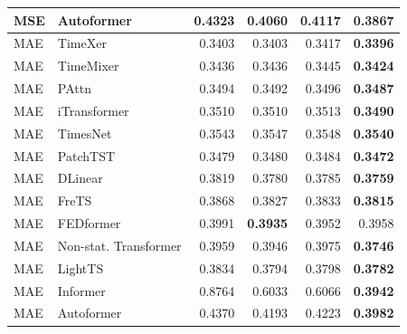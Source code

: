 \begin{longtable}{llrrrr}
MSE & Autoformer & 0.4323 & 0.4060 & 0.4117 & \textbf{0.3867} \\
\midrule
MAE & TimeXer & 0.3403 & 0.3403 & 0.3417 & \textbf{0.3396} \\
MAE & TimeMixer & 0.3436 & 0.3436 & 0.3445 & \textbf{0.3424} \\
MAE & PAttn & 0.3494 & 0.3492 & 0.3496 & \textbf{0.3487} \\
MAE & iTransformer & 0.3510 & 0.3510 & 0.3513 & \textbf{0.3490} \\
MAE & TimesNet & 0.3543 & 0.3547 & 0.3548 & \textbf{0.3540} \\
MAE & PatchTST & 0.3479 & 0.3480 & 0.3484 & \textbf{0.3472} \\
MAE & DLinear & 0.3819 & 0.3780 & 0.3785 & \textbf{0.3759} \\
MAE & FreTS & 0.3868 & 0.3827 & 0.3833 & \textbf{0.3815} \\
MAE & FEDformer & 0.3991 & \textbf{0.3935} & 0.3952 & 0.3958 \\
MAE & Non-stat. Transformer & 0.3959 & 0.3946 & 0.3975 & \textbf{0.3746} \\
MAE & LightTS & 0.3834 & 0.3794 & 0.3798 & \textbf{0.3782} \\
MAE & Informer & 0.8764 & 0.6033 & 0.6066 & \textbf{0.3942} \\
MAE & Autoformer & 0.4370 & 0.4193 & 0.4223 & \textbf{0.3982} \\
\end{longtable}
\endgroup

